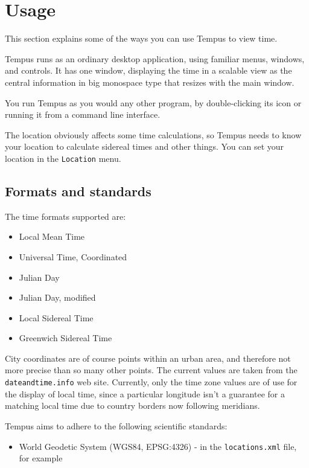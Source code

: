 \section{Usage}

This section explains some of the ways you can use Tempus to view time.

Tempus runs as an ordinary desktop application, using familiar menus, windows, and controls. It has one window, displaying the time in a scalable view as the central information in big monospace type that resizes with the main window.

You run Tempus as you would any other program, by double-clicking its icon or running it from a command line interface. 

The location obviously affects some time calculations, so Tempus needs to know your location to calculate sidereal times and other things. You can set your location in the \texttt{Location} menu.

\subsection{Formats and standards}

The time formats supported are:
\begin{itemize}
    \item Local Mean Time
    \item Universal Time, Coordinated
    \item Julian Day
    \item Julian Day, modified
    \item Local Sidereal Time
    \item Greenwich Sidereal Time
\end{itemize}

City coordinates are of course points within an urban area, and therefore not more precise than so many other points. The current values are taken from the \texttt{dateandtime.info} web site. Currently, only the time zone values are of use for the display of local time, since a particular longitude isn't a guarantee for a matching local time due to country borders now following meridians.

Tempus aims to adhere to the following scientific standards:

\begin{itemize}
    \item World Geodetic System (WGS84, EPSG:4326) - in the \texttt{locations.xml} file, for example
\end{itemize}

